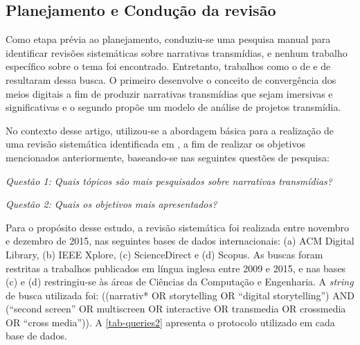 \documentclass[
article,			%
11pt,				%
oneside,			%
a4paper,			%
english,			%
brazil,				%
sumario=tradicional
]{abntex2}
\begin{document}
  \subsection{Planejamento e Condução da revisão}

  Como etapa prévia ao planejamento, conduziu-se uma pesquisa manual para identificar revisões sistemáticas sobre narrativas transmídias, e nenhum trabalho específico sobre o tema foi encontrado. Entretanto, trabalhos como o de  e de  resultaram dessa busca. O primeiro desenvolve o conceito de convergência dos meios digitais a fim de produzir narrativas transmídias que sejam imersivas e significativas e o segundo propõe um modelo de análise de projetos transmídia.

  No contexto desse artigo, utilizou-se a abordagem básica para a realização de uma revisão sistemática identificada em , a fim de realizar os objetivos mencionados anteriormente, baseando-se nas seguintes questões de pesquisa:

  \emph{Questão 1: Quais tópicos são mais pesquisados sobre narrativas transmídias?}

  \emph{Questão 2: Quais os objetivos mais apresentados?}


  Para o propósito desse estudo, a revisão sistemática foi realizada entre novembro e dezembro de 2015, nas seguintes bases de dados internacionais: (a) ACM Digital Library, (b) IEEE Xplore, (c) ScienceDirect e (d) Scopus. As buscas foram restritas a trabalhos publicados em língua inglesa entre 2009 e 2015, e nas bases (c) e (d) restringiu-se às áreas de Ciências da Computação e Engenharia.  A \textit{string} de busca utilizada foi: ((narrativ* OR storytelling OR ``digital storytelling'') AND (``second screen'' OR multiscreen OR interactive OR transmedia OR crossmedia OR ``cross media'')). A \autoref{tab-queries2} apresenta o protocolo utilizado em cada base de dados.
\end{document}
